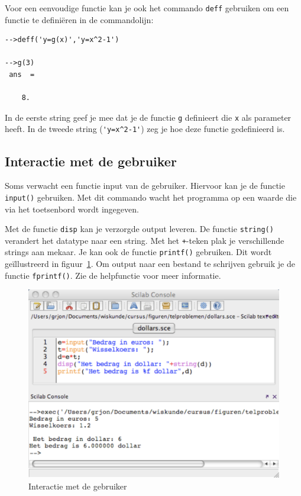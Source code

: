 Voor een eenvoudige functie kan je ook  het commando \verb+deff+ gebruiken om een functie te defini\"eren in de commandolijn:
\begin{lstlisting}[caption={Functie defini\"eren met deff}, label=functiedeff]
-->deff('y=g(x)','y=x^2-1')

-->g(3)
 ans  =
 
    8.   
\end{lstlisting}

In de eerste string geef je mee dat je de functie \verb+g+ definieert die \verb+x+ als parameter heeft. In de tweede string (\verb+'y=x^2-1'+) zeg je hoe deze functie gedefinieerd is.

\subsection{Interactie met de gebruiker}

Soms verwacht een functie input van de gebruiker. Hiervoor kan je de functie \verb+input()+ gebruiken. Met dit commando wacht het programma op een waarde die via het toetsenbord wordt ingegeven. 

Met de functie \verb+disp+ kan je verzorgde output leveren. De functie \verb+string()+ verandert het datatype naar een string. Met het \verb/+/-teken plak je verschillende strings aan mekaar. Je kan ook de functie \verb/printf()/ gebruiken. Dit wordt geïllustreerd in figuur~\ref{fig:input}. Om output naar een bestand te schrijven gebruik je de functie \verb+fprintf()+. Zie de helpfunctie voor meer informatie.

\begin{figure}[h!t]
   \begin{center}
    \includegraphics[width=\textwidth]{figuren/scilab/07input.pdf}
  \caption{Interactie met de gebruiker}
	\label{fig:input}
	\end{center}
\end{figure}

